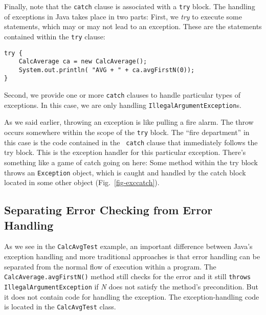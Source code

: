 
\noindent Finally, note that the {\tt catch} clause is associated with a
{\tt try} block.  The handling of exceptions in Java takes place
in two parts: First, we {\it try} to execute some statements,
which may or may not lead to an exception. These are the statements
contained within the {\tt try} clause:

\begin{jjjlisting}
\begin{lstlisting}
try {
    CalcAverage ca = new CalcAverage();
    System.out.println( "AVG + " + ca.avgFirstN(0));        
} 
\end{lstlisting}
\end{jjjlisting}

\noindent Second, we provide one or more {\tt catch} clauses
to handle particular types of exceptions. In this case, we
are only handling {\tt IllegalArgumentException}s.  

As we said earlier, throwing an exception is like pulling a fire alarm.
The throw occurs somewhere within the scope of the {\tt try} block. 
The ``fire department'' in this case is the code contained in the {\tt
catch} clause that immediately follows the try block.  This is the
exception handler for this particular exception. There's something
like a game of catch going on here: Some method within the try block
throws an {\tt Exception} object, which is caught and handled by the
catch block located in some other object (Fig.~\ref{fig-exccatch}).

\begin{figure}[h!]
\end{figure}

\subsection{Separating Error Checking from Error Handling}
\noindent As we see in the {\tt CalcAvgTest} example, an important difference
between Java's exception handling and
more traditional approaches is that error handling can be separated
from the normal flow of execution within a program. The {\tt
CalcAverage.avgFirstN()} method still checks for the error and
it still {\tt throws} {\tt IllegalArgumentException} if {\it N} does not
satisfy the method's precondition.  But it does not contain code for
handling the exception. The exception-handling code is located in the
{\tt CalcAvgTest} class.

